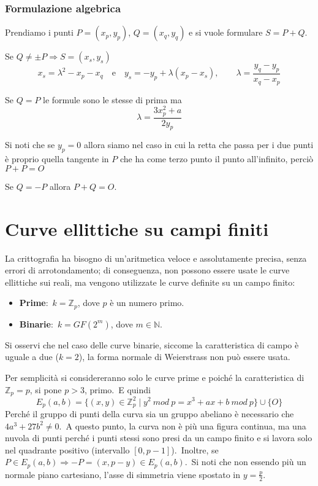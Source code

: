 \subsubsection{Formulazione algebrica}

Prendiamo i punti $P=(x_p, y_p)$, $Q=(x_q, y_q)$ e si vuole formulare $S = P + Q$.\

\vspace{12pt}

\noindent Se $Q \neq \pm P \Rightarrow S = (x_s, y_s)$
\[x_s = \lambda^2 - x_p - x_q \quad \mathrm{e} \quad y_s = -y_p + \lambda (x_p-x_s), \qquad \lambda = \frac{y_q - y_p}{x_q -x_p}\]

\vspace{12pt}

\noindent Se $Q = P$ le formule sono le stesse di prima ma
\[\lambda = \frac{3x_p^2 + a}{2 y_p}\]

\vspace{12pt}

\noindent Si noti che se $y_p = 0$ allora siamo nel caso in cui la retta che passa per i due punti è proprio quella tangente in $P$ che ha come terzo punto il punto all'infinito, perciò $P + P = O$

\vspace{12pt}
\noindent Se $Q = -P$ allora $P + Q = O$.\

\section{Curve ellittiche su campi finiti}

La crittografia ha bisogno di un'aritmetica veloce e assolutamente precisa, senza errori di arrotondamento; di conseguenza, non possono essere usate le curve ellittiche sui reali, ma vengono utilizzate le curve definite su un campo finito:\

\begin{itemize}
    \item \textbf{Prime}:\ $k = \mathbb{Z}_p$, dove $p$ è un numero primo.
    \item \textbf{Binarie}:\ $k = \mathit{GF}(2^m)$, dove $m \in \mathbb{N}$.
\end{itemize}

\noindent Si osservi che nel caso delle curve binarie, siccome la caratteristica di campo è uguale a due ($k=2$), la forma normale di Weierstrass non può essere usata.\

Per semplicità si considereranno solo le curve prime e poiché la caratteristica di $\mathbb{Z}_p = p$, si pone $p > 3$, primo.\
E quindi
\[E_{p}(a,b) = \{(x,y) \in \mathbb{Z}_p^2 \mid y^2\ \mathit{mod}\ p = x^3 + ax + b\ \mathit{mod}\ p\} \cup \{O\}\]
Perché il gruppo di punti della curva sia un gruppo abeliano è necessario che $4a^3 +27b^2 \neq 0$.\
A questo punto, la curva non è più una figura continua, ma una nuvola di punti perché i punti stessi sono presi da un campo finito e si lavora solo nel quadrante positivo (intervallo $[0, p - 1]$).\
Inoltre, se $P \in E_p(a,b) \Rightarrow -P = (x, p-y) \in E_p(a,b)$.\
Si noti che non essendo più un normale piano cartesiano, l'asse di simmetria viene spostato in $y =\frac{p}{2}$.

